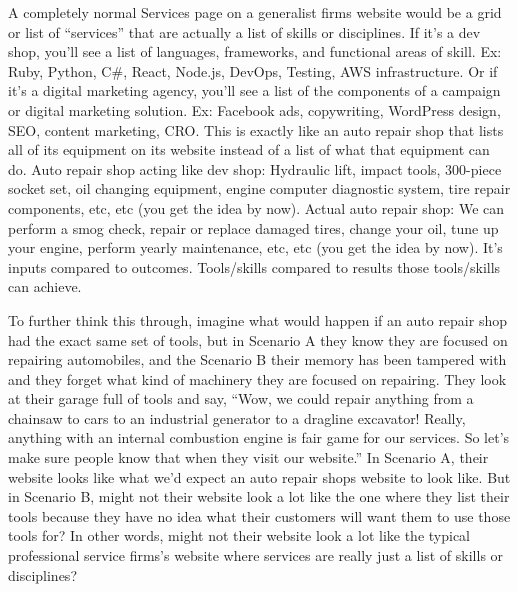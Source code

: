 A completely normal Services page on a generalist firms website would be a grid or list of ``services'' that are actually a list of skills or disciplines. If it's a dev shop, you'll see a list of languages, frameworks, and functional areas of skill. Ex: Ruby, Python, C\#, React, Node.js, DevOps, Testing, AWS infrastructure. Or if it's a digital marketing agency, you'll see a list of the components of a campaign or digital marketing solution. Ex: Facebook ads, copywriting, WordPress design, SEO, content marketing, CRO. This is exactly like an auto repair shop that lists all of its equipment on its website instead of a list of what that equipment can do. Auto repair shop acting like dev shop: Hydraulic lift, impact tools, 300-piece socket set, oil changing equipment, engine computer diagnostic system, tire repair components, etc, etc (you get the idea by now). Actual auto repair shop: We can perform a smog check, repair or replace damaged tires, change your oil, tune up your engine, perform yearly maintenance, etc, etc (you get the idea by now). It's inputs compared to outcomes. Tools/skills compared to results those tools/skills can achieve.

To further think this through, imagine what would happen if an auto repair shop had the exact same set of tools, but in Scenario A they know they are focused on repairing automobiles, and the Scenario B their memory has been tampered with and they forget what kind of machinery they are focused on repairing. They look at their garage full of tools and say, ``Wow, we could repair anything from a chainsaw to cars to an industrial generator to a dragline excavator! Really, anything with an internal combustion engine is fair game for our services. So let's make sure people know that when they visit our website.''  In Scenario A, their website looks like what we'd expect an auto repair shops website to look like. But in Scenario B, might not their website look a lot like the one where they list their tools because they have no idea what their customers will want them to use those tools for? In other words, might not their website look a lot like the typical professional service firms's website where services are really just a list of skills or disciplines?

